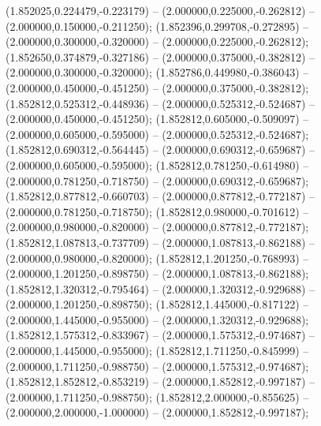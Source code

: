 (1.852025,0.224479,-0.223179) -- (2.000000,0.225000,-0.262812) -- (2.000000,0.150000,-0.211250);
 (1.852396,0.299708,-0.272895) -- (2.000000,0.300000,-0.320000) -- (2.000000,0.225000,-0.262812);
 (1.852650,0.374879,-0.327186) -- (2.000000,0.375000,-0.382812) -- (2.000000,0.300000,-0.320000);
 (1.852786,0.449980,-0.386043) -- (2.000000,0.450000,-0.451250) -- (2.000000,0.375000,-0.382812);
 (1.852812,0.525312,-0.448936) -- (2.000000,0.525312,-0.524687) -- (2.000000,0.450000,-0.451250);
 (1.852812,0.605000,-0.509097) -- (2.000000,0.605000,-0.595000) -- (2.000000,0.525312,-0.524687);
 (1.852812,0.690312,-0.564445) -- (2.000000,0.690312,-0.659687) -- (2.000000,0.605000,-0.595000);
 (1.852812,0.781250,-0.614980) -- (2.000000,0.781250,-0.718750) -- (2.000000,0.690312,-0.659687);
 (1.852812,0.877812,-0.660703) -- (2.000000,0.877812,-0.772187) -- (2.000000,0.781250,-0.718750);
 (1.852812,0.980000,-0.701612) -- (2.000000,0.980000,-0.820000) -- (2.000000,0.877812,-0.772187);
 (1.852812,1.087813,-0.737709) -- (2.000000,1.087813,-0.862188) -- (2.000000,0.980000,-0.820000);
 (1.852812,1.201250,-0.768993) -- (2.000000,1.201250,-0.898750) -- (2.000000,1.087813,-0.862188);
 (1.852812,1.320312,-0.795464) -- (2.000000,1.320312,-0.929688) -- (2.000000,1.201250,-0.898750);
 (1.852812,1.445000,-0.817122) -- (2.000000,1.445000,-0.955000) -- (2.000000,1.320312,-0.929688);
 (1.852812,1.575312,-0.833967) -- (2.000000,1.575312,-0.974687) -- (2.000000,1.445000,-0.955000);
 (1.852812,1.711250,-0.845999) -- (2.000000,1.711250,-0.988750) -- (2.000000,1.575312,-0.974687);
 (1.852812,1.852812,-0.853219) -- (2.000000,1.852812,-0.997187) -- (2.000000,1.711250,-0.988750);
 (1.852812,2.000000,-0.855625) -- (2.000000,2.000000,-1.000000) -- (2.000000,1.852812,-0.997187);
